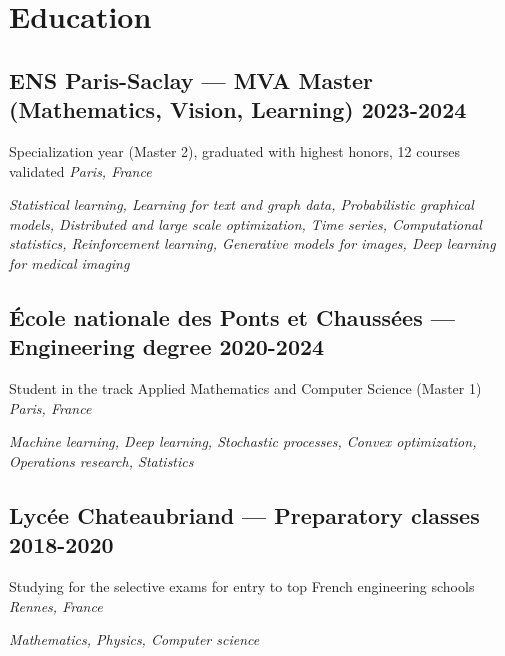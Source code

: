 \section{Education}

\subsection{ENS Paris-Saclay --- MVA Master (Mathematics, Vision, Learning) \hfill \textbf{2023-2024}}
Specialization year (Master 2), graduated with highest honors, 12 courses validated \hfill \textit{Paris, France}\par
\textit{Statistical learning, Learning for text and graph data, Probabilistic graphical models, Distributed and large scale optimization, Time series, Computational statistics, Reinforcement learning, Generative models for images, Deep learning for medical imaging}

\subsection{École nationale des Ponts et Chaussées --- Engineering degree \hfill \textbf{2020-2024}}
Student in the track Applied Mathematics and Computer Science (Master 1) \hfill \textit{Paris, France}\par
\textit{Machine learning, Deep learning, Stochastic processes, Convex optimization, Operations research, Statistics}

\subsection{Lycée Chateaubriand --- Preparatory classes \hfill \textbf{2018-2020}}
Studying for the selective exams for entry to top French engineering schools \hfill \textit{Rennes, France}\par
\textit{Mathematics, Physics, Computer science}
